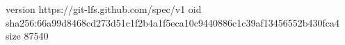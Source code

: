 version https://git-lfs.github.com/spec/v1
oid sha256:66a99d8468cd273d51c1f2b4a1f5eca10c9440886c1c39af13456552b430fca4
size 87540
